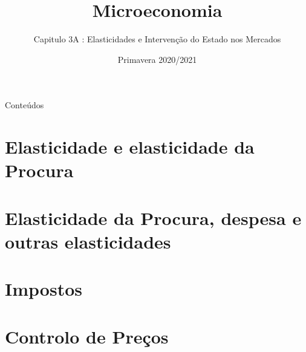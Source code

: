 \documentclass[table]{beamer}
\title{Microeconomia}
\subtitle{Capitulo 3A : Elasticidades e Interven\c c\~ao do Estado nos Mercados}
\author[]{}
\institute[ISCAL]{\texttt{[image: ../visual material/logo\_eng\_full.png]}}
\date{Primavera 2020/2021}
\begin{document}
{
\begin{frame}
	\maketitle
\end{frame}
}

\begin{frame}{Conte\'udos}
  \tableofcontents
\end{frame}

\section{Elasticidade e elasticidade da Procura}

\section{Elasticidade da Procura, despesa e outras elasticidades}

\section{Impostos}

\section{Controlo de Pre\c cos}

\end{document}
